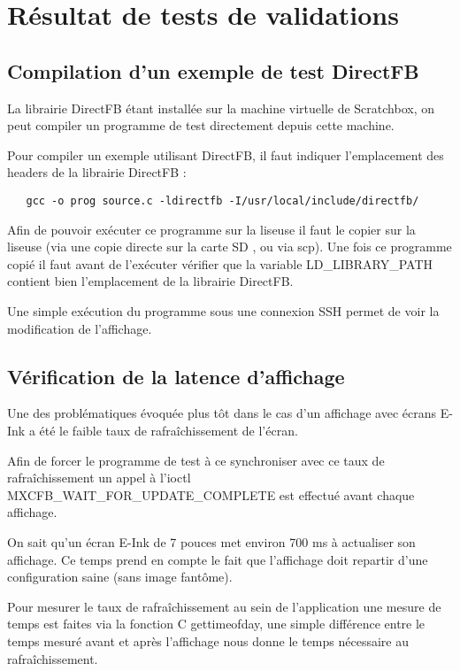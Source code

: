 \chapter{Résultat de tests de validations}


\section{Compilation d'un exemple de test DirectFB}


La librairie DirectFB étant installée sur la machine virtuelle de Scratchbox, on peut compiler un programme de test directement depuis cette machine.

Pour compiler un exemple utilisant DirectFB, il faut indiquer l'emplacement des headers de la librairie DirectFB : 
\begin{lstlisting}
   gcc -o prog source.c -ldirectfb -I/usr/local/include/directfb/
\end{lstlisting}

Afin de pouvoir exécuter ce programme sur la liseuse il faut le copier sur la liseuse (via une copie directe sur la carte SD , ou via scp).
Une fois ce programme copié il faut avant de l'exécuter vérifier que la variable LD_LIBRARY_PATH contient bien l'emplacement de la librairie DirectFB.

Une simple exécution du programme sous une connexion SSH permet de voir la modification de l'affichage.

\section{Vérification de la latence d'affichage}

Une des problématiques évoquée plus tôt dans le cas d'un affichage avec écrans E-Ink a été le faible taux de rafraîchissement de l'écran.

Afin de forcer le programme de test à ce synchroniser avec ce taux de rafraîchissement un appel à l'ioctl MXCFB_WAIT_FOR_UPDATE_COMPLETE est effectué avant chaque affichage. 

On sait qu'un écran E-Ink de 7 pouces met environ 700 ms à actualiser son affichage. Ce temps prend en compte le fait que l'affichage doit repartir d'une configuration saine (sans image fantôme).

Pour mesurer le taux de rafraîchissement au sein de l'application une mesure de temps est faites via la fonction C gettimeofday, une simple différence entre le temps mesuré avant et après l'affichage nous donne le temps nécessaire au rafraîchissement.

